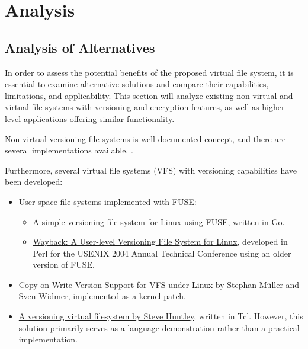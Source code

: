 \chapter{Analysis}
\label{chap:analysis}


\section{Analysis of Alternatives}\label{sec:alternatives}

In order to assess the potential benefits of the proposed virtual file system, it is essential to examine alternative solutions and compare their capabilities, limitations, and applicability.
This section will analyze existing non-virtual and virtual file systems with versioning and encryption features, as well as higher-level applications offering similar functionality.

Non-virtual versioning file systems is well documented concept, and there are several implementations available.
.

Furthermore, several virtual file systems (VFS) with versioning capabilities have been developed:

\begin{itemize}
    \item User space file systems implemented with FUSE:
    \begin{itemize}
        \item \href{https://github.com/FooSoft/vfs}{A simple versioning file system for Linux using FUSE}, written in Go.
        \item \href{https://www.usenix.org/legacy/events/usenix04/tech/freenix/cornell.html}{Wayback: A User-level Versioning File System for Linux}, developed in Perl for the USENIX 2004 Annual Technical Conference using an older version of FUSE.
    \end{itemize}
    \item \href{https://osm.hpi.de/vvfs/}{Copy-on-Write Version Support for VFS under Linux} by Stephan Müller and Sven Widmer, implemented as a kernel patch.
    \item \href{https://wiki.tcl-lang.org/page/A+versioning+virtual+filesystem}{A versioning virtual filesystem by Steve Huntley}, written in Tcl.
    However, this solution primarily serves as a language demonstration rather than a practical implementation.
\end{itemize}

